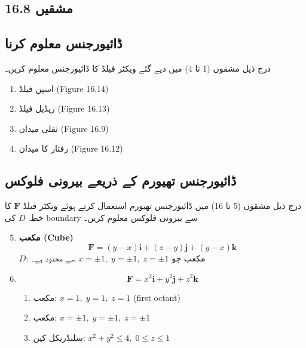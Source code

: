\begin{enumerate}

\section*{مشقیں 16.8}

\subsection*{ڈائیورجنس معلوم کرنا}

درج ذیل مشقوں (1 تا 4) میں دیے گئے ویکٹر فیلڈ کا ڈائیورجنس معلوم کریں۔

\begin{enumerate}
\item اسپن فیلڈ (Figure 16.14)

\item ریڈیل فیلڈ (Figure 16.13)

\item ثقلی میدان (Figure 16.9)

\item رفتار کا میدان (Figure 16.12)
\end{enumerate}

\bigskip

\subsection*{ڈائیورجنس تھیورم کے ذریعے بیرونی فلوکس}

درج ذیل مشقوں (5 تا 16) میں ڈائیورجنس تھیورم استعمال کرتے ہوئے ویکٹر فیلڈ \( \mathbf{F} \) کا خطہ \( D \) کی boundary سے بیرونی فلوکس معلوم کریں۔

\begin{enumerate}
\setcounter{enumi}{4}

\item \textbf{مکعب (Cube)}
\[
\mathbf{F} = (y - x)\mathbf{i} + (z - y)\mathbf{j} + (y - x)\mathbf{k}
\]
\( D \): مکعب جو \( x=\pm1,\; y=\pm1,\; z=\pm1 \) سے محدود ہے۔

\item
\[
\mathbf{F} = x^2\mathbf{i} + y^2\mathbf{j} + z^2\mathbf{k}
\]

\begin{enumerate}
\item مکعب: \( x=1,\; y=1,\; z=1 \) (first octant)
\item مکعب: \( x=\pm1,\; y=\pm1,\; z=\pm1 \)
\item سلنڈریکل کین: \( x^2+y^2 \le 4,\; 0 \le z \le 1 \)
\end{enumerate}


\end{enumerate}
\end{enumerate}
